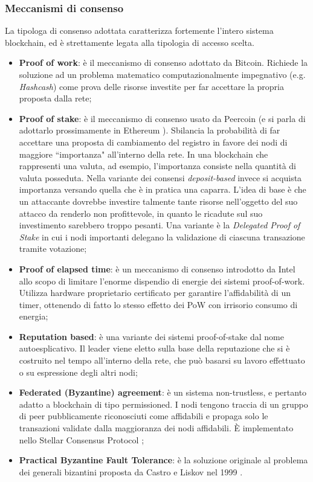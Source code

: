 		\subsubsection{Meccanismi di consenso}
			La tipologa di consenso adottata caratterizza fortemente l'intero sistema blockchain, ed è strettamente legata alla tipologia di accesso scelta.
			\begin{itemize}
				\item \textbf{Proof of work}: è il meccanismo di consenso adottato da Bitcoin. Richiede la soluzione ad un problema matematico computazionalmente impegnativo (e.g. \emph{Hashcash}) come prova delle risorse investite per far accettare la propria proposta dalla rete;
				\item \textbf{Proof of stake}: è il meccanismo di consenso usato da Peercoin (e si parla di adottarlo prossimamente in Ethereum \cite{casper}). Sbilancia la probabilità di far accettare una proposta di cambiamento del registro in favore dei nodi di maggiore ``importanza" all'interno della rete. In una blockchain che rappresenti una valuta, ad esempio, l'importanza consiste nella quantità di valuta posseduta. Nella variante dei consensi \emph{deposit-based} invece si acquista importanza versando quella che è in pratica una caparra. L'idea di base è che un attaccante dovrebbe investire talmente tante risorse nell'oggetto del suo attacco da renderlo non profittevole, in quanto le ricadute sul suo investimento sarebbero troppo pesanti. Una variante è la \emph{Delegated Proof of Stake} in cui i nodi importanti delegano la validazione di ciascuna transazione tramite votazione;
				\item \textbf{Proof of elapsed time}: è un meccanismo di consenso introdotto da Intel \cite{poet} allo scopo di limitare l'enorme dispendio di energie dei sistemi proof-of-work. Utilizza hardware proprietario certificato per garantire l'affidabilità di un timer, ottenendo di fatto lo stesso effetto dei PoW con irrisorio consumo di energia;
				\item \textbf{Reputation based}: è una variante dei sistemi proof-of-stake dal nome autoesplicativo. Il leader viene eletto sulla base della reputazione che si è costruito nel tempo all'interno della rete, che può basarsi su lavoro effettuato o su espressione degli altri nodi;
				\item \textbf{Federated (Byzantine) agreement}: è un sistema non-trustless, e pertanto adatto a blockchain di tipo permissioned. I nodi tengono traccia di un gruppo di peer pubblicamente riconosciuti come affidabili e propaga solo le transazioni validate dalla maggioranza dei nodi affidabili. È implementato nello Stellar Consensus Protocol \cite{stellar_protocol}; 
				\item \textbf{Practical Byzantine Fault Tolerance}: è la soluzione originale al problema dei generali bizantini proposta da Castro e Liskov nel 1999 \cite{PBFT}.
			\end{itemize}

